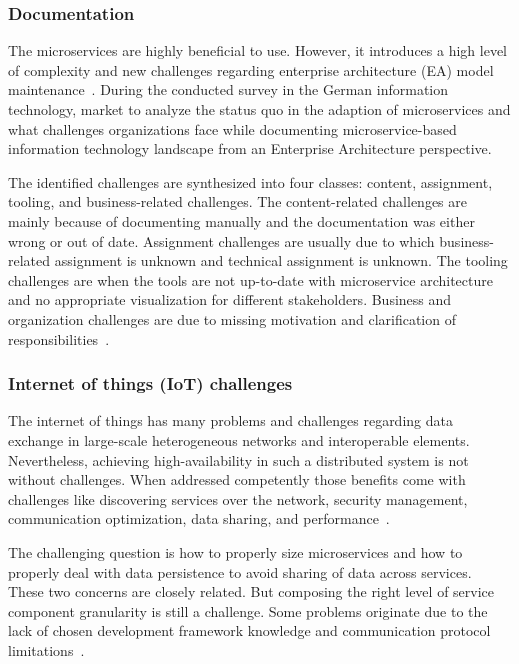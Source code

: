 \subsubsection{Documentation}%

The microservices are highly beneficial to use. However, it introduces a high level of complexity and new challenges regarding enterprise architecture (EA) model maintenance~\cite{Kevin2015}. During the conducted survey in the German information technology, market to analyze the status quo in the adaption of microservices and what challenges organizations face while documenting microservice-based information technology landscape from an Enterprise Architecture perspective. 

\par The identified challenges are synthesized into four classes: content, assignment, tooling, and business-related challenges. The content-related challenges are mainly because of documenting manually and the documentation was either wrong or out of date. Assignment challenges are usually due to which business-related assignment is unknown and technical assignment is unknown. The tooling challenges are when the tools are not up-to-date with microservice architecture and no appropriate visualization for different stakeholders. Business and organization challenges are due to missing motivation and clarification of responsibilities~\cite{kleehaus2019, selmadji2020}.



\subsubsection{Internet of things (IoT) challenges}%

The internet of things has many problems and challenges regarding data exchange in large-scale heterogeneous networks and interoperable elements. Nevertheless, achieving high-availability in such a distributed system is not without challenges. When addressed competently those benefits come with challenges like discovering services over the network, security management, communication optimization, data sharing, and performance~\cite{khan2017}.
 
\par The challenging question is how to properly size microservices and how to properly deal with data persistence to avoid sharing of data across services. These two concerns are closely related. But composing the right level of service component granularity is still a challenge. Some problems originate due to the lack of chosen development framework knowledge and communication protocol limitations~\cite{khan2020}. 


